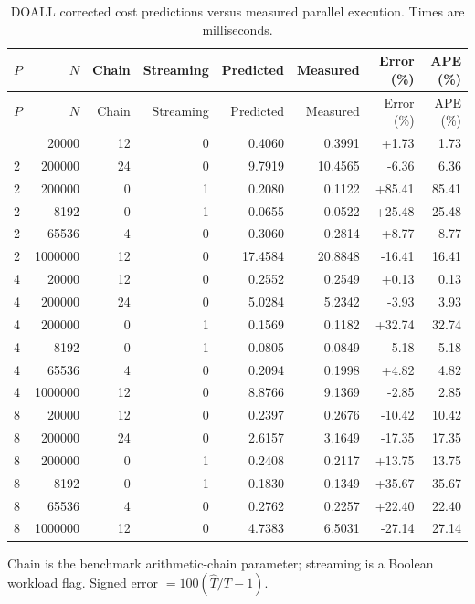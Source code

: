\begin{center}
\small
\begin{longtable}{lrrrrrrr}
\caption{DOALL corrected cost predictions versus measured parallel execution. Times are milliseconds.}\label{tab:doall-detail}\\
\toprule
$P$ & $N$ & Chain & Streaming & Predicted & Measured & Error (\%) & APE (\%) \\
\midrule
\endfirsthead
\toprule
$P$ & $N$ & Chain & Streaming & Predicted & Measured & Error (\%) & APE (\%) \\
\midrule
\endhead
\bottomrule\endfoot
2 & 20000 & 12 & 0 & 0.4060 & 0.3991 & +1.73 & 1.73 \\
2 & 200000 & 24 & 0 & 9.7919 & 10.4565 & -6.36 & 6.36 \\
2 & 200000 & 0 & 1 & 0.2080 & 0.1122 & +85.41 & 85.41 \\
2 & 8192 & 0 & 1 & 0.0655 & 0.0522 & +25.48 & 25.48 \\
2 & 65536 & 4 & 0 & 0.3060 & 0.2814 & +8.77 & 8.77 \\
2 & 1000000 & 12 & 0 & 17.4584 & 20.8848 & -16.41 & 16.41 \\
4 & 20000 & 12 & 0 & 0.2552 & 0.2549 & +0.13 & 0.13 \\
4 & 200000 & 24 & 0 & 5.0284 & 5.2342 & -3.93 & 3.93 \\
4 & 200000 & 0 & 1 & 0.1569 & 0.1182 & +32.74 & 32.74 \\
4 & 8192 & 0 & 1 & 0.0805 & 0.0849 & -5.18 & 5.18 \\
4 & 65536 & 4 & 0 & 0.2094 & 0.1998 & +4.82 & 4.82 \\
4 & 1000000 & 12 & 0 & 8.8766 & 9.1369 & -2.85 & 2.85 \\
8 & 20000 & 12 & 0 & 0.2397 & 0.2676 & -10.42 & 10.42 \\
8 & 200000 & 24 & 0 & 2.6157 & 3.1649 & -17.35 & 17.35 \\
8 & 200000 & 0 & 1 & 0.2408 & 0.2117 & +13.75 & 13.75 \\
8 & 8192 & 0 & 1 & 0.1830 & 0.1349 & +35.67 & 35.67 \\
8 & 65536 & 4 & 0 & 0.2762 & 0.2257 & +22.40 & 22.40 \\
8 & 1000000 & 12 & 0 & 4.7383 & 6.5031 & -27.14 & 27.14 \\
\bottomrule
\end{longtable}
\par\medskip\begin{minipage}{0.98\linewidth}\footnotesize Chain is the benchmark arithmetic-chain parameter; streaming is a Boolean workload flag. Signed error $=100(\widehat T/T-1)$.\end{minipage}
\end{center}
